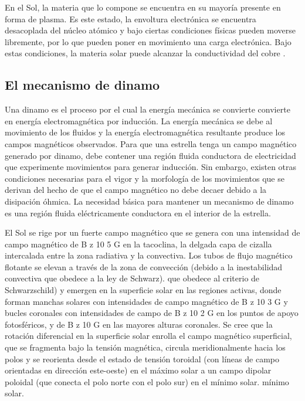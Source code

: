 En el Sol, la materia que lo compone se encuentra en su mayoría presente en forma de plasma. Es este estado, la envoltura electrónica se encuentra desacoplada del núcleo atómico y bajo ciertas condiciones físicas pueden moverse libremente, por lo que pueden poner en movimiento una carga electrónica. Bajo estas condiciones, la materia solar puede alcanzar la conductividad del cobre \cite{Banisch2009}.\par

\subsection{El mecanismo de dinamo}
Una dinamo es el proceso por el cual la energía mecánica se convierte
convierte en energía electromagnética por inducción. La energía mecánica se debe al movimiento de los fluidos y la energía electromagnética resultante produce los campos magnéticos observados. Para que una estrella tenga un campo magnético generado por dinamo, debe contener una región fluida conductora de electricidad que experimente movimientos para generar inducción. Sin embargo, existen otras condiciones necesarias para el vigor y la morfología de los movimientos que se derivan del hecho de que el campo magnético no debe decaer debido a la disipación óhmica. La necesidad básica para mantener un mecanismo de dinamo es una región fluida eléctricamente conductora en el interior de la estrella.

El Sol se rige por un fuerte campo magnético que se genera con una intensidad de campo magnético de B z 10 5 G \cite{Aschwanden2014} en la tacoclina, la delgada capa de cizalla intercalada entre la zona radiativa y la convectiva. Los tubos de flujo magnético flotante se elevan a través de la zona de convección (debido a la inestabilidad convectiva que obedece a la ley de Schwarz).
que obedece al criterio de Schwarzschild) y emergen en la superficie solar en las regiones activas, donde forman manchas solares con intensidades de campo magnético de B z 10 3 G y bucles coronales con intensidades de campo de B z 10 2 G en los puntos de apoyo fotosféricos, y de B z 10 G en las mayores alturas coronales. Se cree que la rotación diferencial en la superficie solar enrolla el campo magnético superficial, que se fragmenta bajo la tensión magnética, circula meridionalmente hacia los polos y se reorienta desde el estado de tensión toroidal (con líneas de campo orientadas en dirección este-oeste) en el máximo solar a un campo dipolar poloidal (que conecta el polo norte con el polo sur) en el mínimo solar.
mínimo solar.

